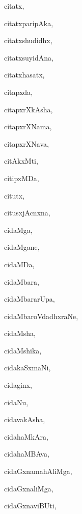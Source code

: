 \begin{multicols}{3}
{\noindent
{citatx}, \pageref{citatx}

\noindent
{citatxparipAka}, \pageref{citatxparipAka}

\noindent
{citatxshudidhx}, \pageref{citatxshudidhx}

\noindent
{citatxsuyidAna}, \pageref{citatxsuyidAna}

\noindent
{citatxhasatx}, \pageref{citatxhasatx}

\noindent
{citapxda}, \pageref{citapxda}

\noindent
{citapxrXkAsha}, \pageref{citapxrXkAsha}

\noindent
{citapxrXNama}, \pageref{citapxrXNama}

\noindent
{citapxrXNava}, \pageref{citapxrXNava}

\noindent
{citAkxMti}, \pageref{citAkxMti}

\noindent
{citipxMDa}, \pageref{citipxMDa}

\noindent
{citutx}, \pageref{citutx}

\noindent
{citusxjAcnxna}, \pageref{citusxjAcnxna}

\noindent
{cidaMga}, \pageref{cidaMga}

\noindent
{cidaMgane}, \pageref{cidaMgane}

\noindent
{cidaMDa}, \pageref{cidaMDa}

\noindent
{cidaMbara}, \pageref{cidaMbara}

\noindent
{cidaMbararUpa}, \pageref{cidaMbararUpa}

\noindent
{cidaMbaroVdadhxraNe}, \pageref{cidaMbaroVdadhxraNe}

\noindent
{cidaMsha}, \pageref{cidaMsha}

\noindent
{cidaMshika}, \pageref{cidaMshika}

\noindent
{cidakaSxmaNi}, \pageref{cidakaSxmaNi}

\noindent
{cidaginx}, \pageref{cidaginx}

\noindent
{cidaNu}, \pageref{cidaNu}

\noindent
{cidavakAsha}, \pageref{cidavakAsha}

\noindent
{cidahaMkAra}, \pageref{cidahaMkAra}

\noindent
{cidahaMBAva}, \pageref{cidahaMBAva}

\noindent
{cidaGxnamahAliMga}, \pageref{cidaGxnamahAliMga}

\noindent
{cidaGxnaliMga}, \pageref{cidaGxnaliMga}

\noindent
{cidaGxnaviBUti}, \pageref{cidaGxnaviBUti}

}
\end{multicols}
